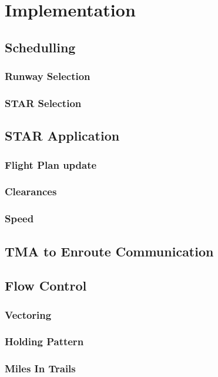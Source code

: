 \chapter{Implementation}

\section{Schedulling}
\subsection{Runway Selection}
\subsection{STAR Selection}

\section{STAR Application}
\subsection{Flight Plan update}
\subsection{Clearances}
\subsection{Speed}

\section{TMA to Enroute Communication}

\section{Flow Control}
\subsection{Vectoring}
\subsection{Holding Pattern}
\subsection{Miles In Trails}


